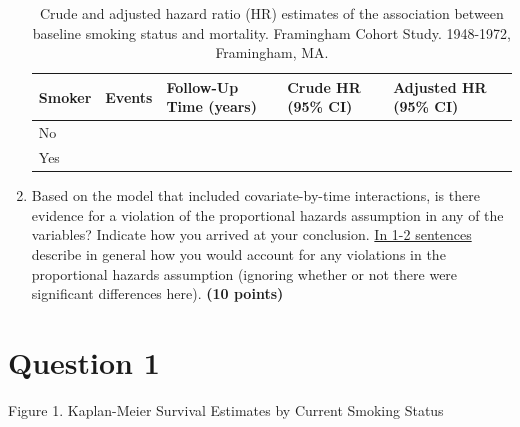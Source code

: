 \documentclass{article}\usepackage[]{graphicx}\usepackage[]{color}
\newif\ifdraft  %
\begin{document}
\begin{enumerate}
\begin{table}[H]
\centering
\parbox{10cm}{\caption{Crude and adjusted hazard ratio (HR) estimates of the association between baseline smoking status and mortality. Framingham Cohort Study. 1948-1972, Framingham, MA.}} 
\begin{tabular}{lllll}
  \hline
Smoker & Events & Follow-Up Time (years) & Crude HR (95\% CI) & Adjusted HR (95\% CI) \\ 
  \hline
No &  &  &  &  \\ 
  Yes &  &  &  &  \\ 
   \hline
\end{tabular}
\end{table}

  
  \item Based on the model that included covariate-by-time interactions, is there evidence for a violation of the proportional hazards assumption in any of the variables? Indicate how you arrived at your conclusion. \ul{In 1-2 sentences} describe in general how you would account for any violations in the proportional hazards assumption (ignoring whether or not there were significant differences here). \textbf{(10 points)}
\end{enumerate}

\pagebreak

\section*{Question 1}

\ifdraft

Using the Kaplan-Meier plots, graphically assess the relationship between baseline smoking status and time to death. \textbf{Briefly interpret what you see.} In 1-2 sentences describe the limitations of this approach. [{\ul{include the graph}}, labeled \textbf{Figure 1}] \textbf{(10 points)}

\fi

Figure 1. Kaplan-Meier Survival Estimates by Current Smoking Status
\end{document}
